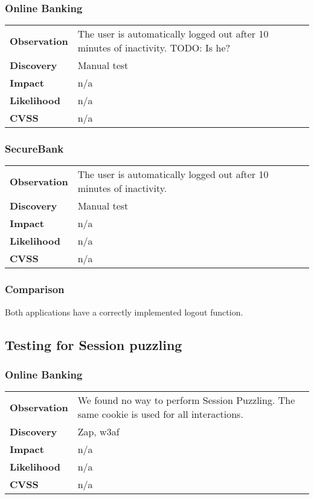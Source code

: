 \subsubsection*{Online Banking}

\begin{tabular}{l|p{10cm}}
\textbf{Observation} & The user is automatically logged out after 10 minutes of inactivity. TODO: Is he? \\
\textbf{Discovery} & Manual test \\
\textbf{Impact} & n/a \\
\textbf{Likelihood} & n/a \\
\textbf{CVSS} & n/a \\
\end{tabular}

\subsubsection*{SecureBank}

\begin{tabular}{l|p{10cm}}
\textbf{Observation} & The user is automatically logged out after 10 minutes of inactivity. \\
\textbf{Discovery} & Manual test \\
\textbf{Impact} & n/a \\
\textbf{Likelihood} & n/a \\
\textbf{CVSS} & n/a \\
\end{tabular}

\subsubsection*{Comparison}
Both applications have a correctly implemented logout function.

\clearpage


\subsection{Testing for Session puzzling}

\subsubsection*{Online Banking}

\begin{tabular}{l|p{10cm}}
\textbf{Observation} & We found no way to perform Session Puzzling. The same cookie is used for all interactions. \\
\textbf{Discovery} & Zap, w3af \\
\textbf{Impact} & n/a \\
\textbf{Likelihood} & n/a \\
\textbf{CVSS} & n/a \\
\end{tabular}

